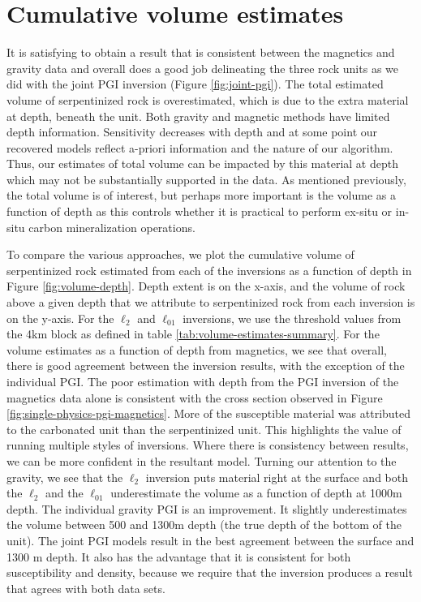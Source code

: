 \documentclass[
    paper,
  ]{geophysics}
\begin{document}




\section{Cumulative volume estimates}
It is satisfying to obtain a result that is consistent between the magnetics and gravity data and overall does a good job delineating the three rock units as we did with the joint PGI inversion (Figure \ref{fig:joint-pgi}). The total estimated volume of serpentinized rock is overestimated, which is due to the extra material at depth, beneath the unit. Both gravity and magnetic methods have limited depth information. Sensitivity decreases with depth and at some point our recovered models reflect a-priori information and the nature of our algorithm. Thus, our estimates of total volume can be impacted by this material at depth which may not be substantially supported in the data. As mentioned previously, the total volume is of interest, but perhaps more important is the volume as a function of depth as this controls whether it is practical to perform ex-situ or in-situ carbon mineralization operations.

To compare the various approaches, we plot the cumulative volume of serpentinized rock estimated from each of the inversions as a function of depth in Figure \ref{fig:volume-depth}. Depth extent is on the x-axis, and the volume of rock above a given depth that we attribute to serpentinized rock from each inversion is on the y-axis. For the $\ell_2$ and $\ell_{01}$ inversions, we use the threshold values from the 4km block as defined in table \ref{tab:volume-estimates-summary}. For the volume estimates as a function of depth from magnetics, we see that overall, there is good agreement between the inversion results, with the exception of the individual PGI. The poor estimation with depth from the PGI inversion of the magnetics data alone is consistent with the cross section observed in Figure \ref{fig:single-physics-pgi-magnetics}. More of the susceptible material was attributed to the carbonated unit than the serpentinized unit. This highlights the value of running multiple styles of inversions. Where there is consistency between results, we can be more confident in the resultant model. Turning our attention to the gravity, we see that the $\ell_2$ inversion puts material right at the surface and both the $\ell_2$ and the $\ell_{01}$ underestimate the volume as a function of depth at 1000m depth. The individual gravity PGI is an improvement. It slightly underestimates the volume between 500 and 1300m depth (the true depth of the bottom of the unit). The joint PGI models result in the best agreement between the surface and 1300 m depth. It also has the advantage that it is consistent for both susceptibility and density, because we require that the inversion produces a result that agrees with both data sets.
\end{document}
